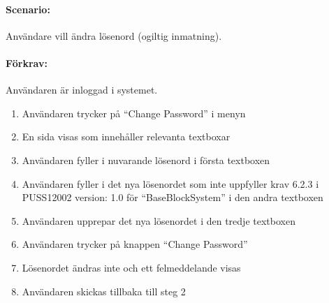 \documentclass[paper=a4, fontsize=11pt,twoside]{article}
\begin{document}
\paragraph{Scenario:}Användare vill ändra lösenord (ogiltig inmatning).
\paragraph{Förkrav:}
Användaren är inloggad i systemet.
\begin{enumerate}
\item  Användaren trycker på “Change Password” i menyn
\item	 En sida visas som innehåller relevanta textboxar
\item	Användaren fyller i nuvarande lösenord i första textboxen
\item	Användaren fyller i det nya lösenordet som inte uppfyller krav 6.2.3 i PUSS12002 version: 1.0 för “BaseBlockSystem” i den andra textboxen
\item	Användaren upprepar det nya lösenordet i den tredje textboxen
\item	Användaren trycker på knappen “Change Password”
\item	Lösenordet ändras inte och ett felmeddelande visas
\item Användaren skickas tillbaka till steg 2
\end{enumerate}
\end{document}
